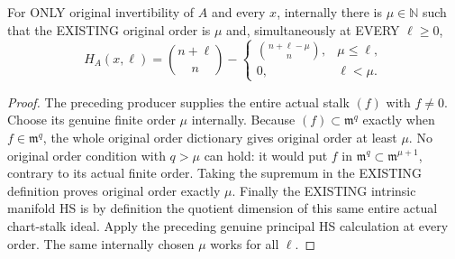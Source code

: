 \begin{theorem}
\label{hir:actual-invertible-original-order-entire-intrinsic-hs}
\leanok
{}
For ONLY original invertibility of $A$ and every $x$, internally there is
$\mu\in\mathbb N$ such that the EXISTING original order is $\mu$ and,
simultaneously at EVERY $\ell\ge0$,
\[
 H_A(x,\ell)=\binom{n+\ell}{n}
 -\begin{cases}\binom{n+\ell-\mu}{n},&\mu\le\ell,\\0,&\ell<\mu.\end{cases}
\]
\end{theorem}
\begin{proof}
The preceding producer supplies the entire actual stalk $(f)$ with
$f\ne0$. Choose its genuine finite order $\mu$ internally. Because
$(f)\subset\mathfrak m^q$ exactly when $f\in\mathfrak m^q$, the whole
original order dictionary gives original order at least $\mu$. No
original order condition with $q>\mu$ can hold: it would put $f$ in
$\mathfrak m^q\subset\mathfrak m^{\mu+1}$, contrary to its actual
finite order. Taking the supremum in the EXISTING definition proves
original order exactly $\mu$. Finally the EXISTING intrinsic manifold HS
is by definition the quotient dimension of this same entire actual
chart-stalk ideal. Apply the preceding genuine principal HS calculation
at every order. The same internally chosen $\mu$ works for all $\ell$.
\end{proof}
